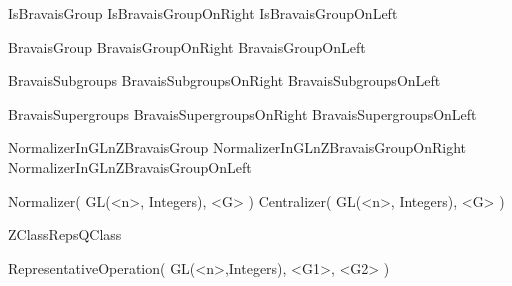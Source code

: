





\begintt
IsBravaisGroup
IsBravaisGroupOnRight
IsBravaisGroupOnLeft

BravaisGroup
BravaisGroupOnRight
BravaisGroupOnLeft

BravaisSubgroups
BravaisSubgroupsOnRight
BravaisSubgroupsOnLeft

BravaisSupergroups
BravaisSupergroupsOnRight
BravaisSupergroupsOnLeft

NormalizerInGLnZBravaisGroup
NormalizerInGLnZBravaisGroupOnRight 
NormalizerInGLnZBravaisGroupOnLeft 

Normalizer(  GL(<n>, Integers), <G> ) 
Centralizer( GL(<n>, Integers), <G> )

ZClassRepsQClass

RepresentativeOperation( GL(<n>,Integers), <G1>, <G2> )
\endtt





